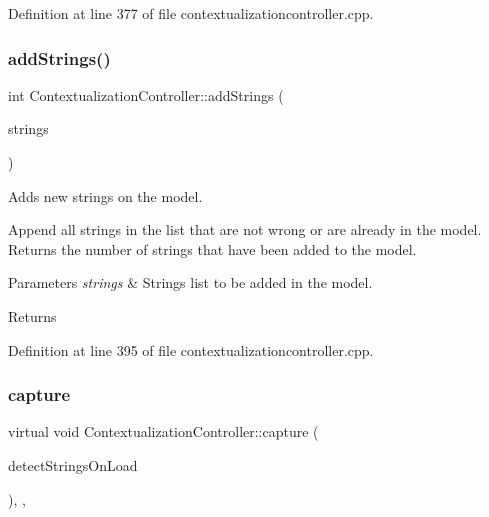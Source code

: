 Definition at line 377 of file contextualizationcontroller.\+cpp.

\mbox{\label{classContextualizationController_a4af8f49a57b9d9a7daf5b51d45620ed6}} 
\subsubsection{\texorpdfstring{add\+Strings()}{addStrings()}}
{\footnotesize\ttfamily int Contextualization\+Controller\+::add\+Strings (\begin{DoxyParamCaption}\item[{const Q\+List$<$ \mbox{\hyperlink{classFirmwareString}{Firmware\+String}} $\ast$$>$ \&}]{strings }\end{DoxyParamCaption})\hspace{0.3cm}{\ttfamily [protected]}}



Adds new strings on the model. 

Append all strings in the list that are not wrong or are already in the model. Returns the number of strings that have been added to the model. 
\begin{DoxyParams}{Parameters}
{\em strings} & Strings list to be added in the model. \\
\hline
\end{DoxyParams}
\begin{DoxyReturn}{Returns}

\end{DoxyReturn}


Definition at line 395 of file contextualizationcontroller.\+cpp.

\mbox{\label{classContextualizationController_ad9e65625e6dc228858cf2c9606606691}} 
\subsubsection{\texorpdfstring{capture}{capture}}
{\footnotesize\ttfamily virtual void Contextualization\+Controller\+::capture (\begin{DoxyParamCaption}\item[{bool}]{detect\+Strings\+On\+Load }\end{DoxyParamCaption})\hspace{0.3cm}{\ttfamily [protected]}, {}, {\ttfamily [slot]}}



